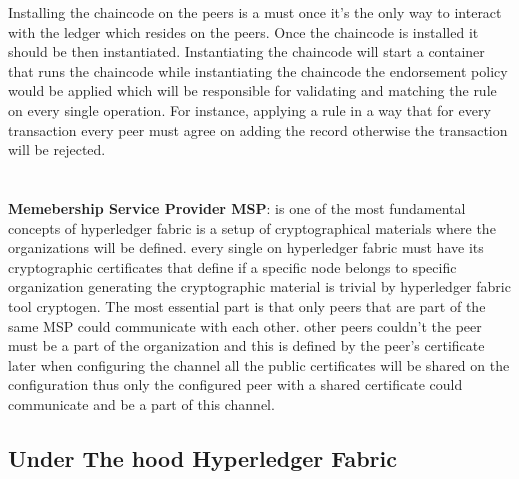 Installing the chaincode on the peers is a must once it's the only way to interact with the ledger which resides on the peers. 
Once the chaincode is installed it should be then instantiated. 
Instantiating the chaincode will start a container that runs the chaincode while instantiating the chaincode the endorsement policy would be applied which will be responsible for validating and matching the rule on every single operation. For instance, applying a rule in a way  that for every transaction every peer must agree on adding the record otherwise the transaction will be rejected. \\  \\  \\ 
 
\textbf{Memebership Service Provider MSP}: is one of the most fundamental concepts of hyperledger fabric is a setup of cryptographical materials where the organizations will be defined. every single on hyperledger fabric must have its cryptographic certificates that define if a specific node belongs to specific organization generating the cryptographic material is trivial by hyperledger fabric tool cryptogen. 
The most essential part is that only peers that are part of the same MSP could communicate with each other. other peers couldn't the peer must be a part of the organization and this is defined by the peer's certificate later when configuring the channel all the public certificates will be shared on the configuration thus only the configured peer with a shared certificate could communicate and be a part of this channel. 


\cleardoublepage

\subsection{Under The hood Hyperledger Fabric }

